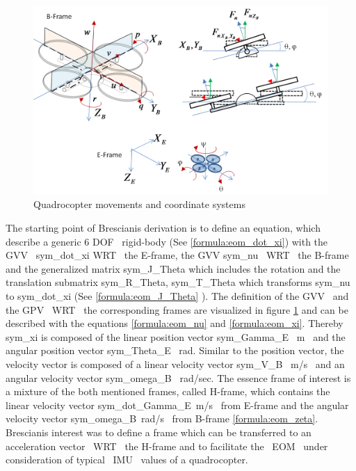 \begin{figure}[H]
	\centering
		\includegraphics[width=1\textwidth]{graphic/QuadrocopterPhysicalModel.png}
	\caption{Quadrocopter movements and coordinate systems}
	\label{fig:QuadrocopterPhysicalModel}
\end{figure}

The starting point of Brescianis derivation is to define an equation, which
describe a generic 6 \gls{DOF}~ rigid-body (See \ref{formula:eom_dot_xi}) with the
\gls{GVV}~ \gls{sym_dot_xi} \gls{WRT}~ the E-frame, the \gls{GVV} \gls{sym_nu}~ \gls{WRT}~ the
B-frame and the generalized matrix \gls{sym_J_Theta} which includes the
rotation and the translation submatrix \gls{sym_R_Theta},
\gls{sym_T_Theta} which transforms \gls{sym_nu} to
\gls{sym_dot_xi} (See \ref{formula:eom_J_Theta} ). The definition of the \gls{GVV}~
and the \gls{GPV}~ \gls{WRT}~ the corresponding frames are visualized in figure
\ref{fig:QuadrocopterPhysicalModel}
 and can be described with the equations \ref{formula:eom_nu} and
 \ref{formula:eom_xi}. Thereby \gls{sym_xi} is composed of the linear
 position vector \gls{sym_Gamma_E}~ \lbrack m\rbrack~ and the angular
 position vector \gls{sym_Theta_E}~ \lbrack rad\rbrack. Similar to the
 position vector, the velocity vector is composed of a linear velocity vector
 \gls{sym_V_B}
~\lbrack m/s\rbrack~ and an angular velocity vector \gls{sym_omega_B}
 ~\lbrack rad/sec\rbrack. 
\newpage
The essence frame of interest is a mixture of the both
 mentioned frames, called H-frame, which contains the linear velocity vector
 \gls{sym_dot_Gamma_E}~\lbrack m/s\rbrack~ from E-frame and the angular
 velocity vector \gls{sym_omega_B}~\lbrack rad/s\rbrack~ from B-frame
 \ref{formula:eom_zeta}. Brescianis interest was to define a frame which can be
 transferred to an acceleration vector ~\gls{WRT}~ the H-frame and to facilitate the
 ~\gls{EOM}~ under consideration of typical ~\gls{IMU}~ values of a quadrocopter.

